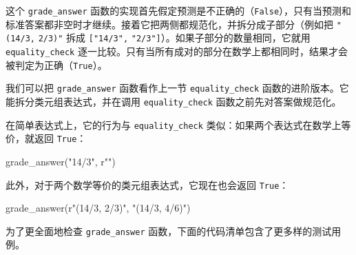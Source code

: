 这个 \texttt{grade\_answer} 函数的实现首先假定预测是不正确的（\texttt{False}），只有当预测和标准答案都非空时才继续。接着它把两侧都规范化，并拆分成子部分（例如把 \texttt{"}\texttt{(14/3,} \texttt{2/3)}\texttt{"} 拆成 \texttt{[}\texttt{"}\texttt{14/3}\texttt{"}\texttt{,} \texttt{"}\texttt{2/3}\texttt{"}\texttt{]}）。如果子部分的数量相同，它就用 \texttt{equality\_check} 逐一比较。只有当所有成对的部分在数学上都相同时，结果才会被判定为正确（\texttt{True}）。

我们可以把 \texttt{grade\_answer} 函数看作上一节 \texttt{equality\_check} 函数的进阶版本。它能拆分类元组表达式，并在调用 \texttt{equality\_check} 函数之前先对答案做规范化。

在简单表达式上，它的行为与 \texttt{equality\_check} 类似：如果两个表达式在数学上等价，就返回 \texttt{True}：

\begin{codebox}
grade_answer("14/3", r"")
\end{codebox}

此外，对于两个数学等价的类元组表达式，它现在也会返回 \texttt{True}：

\begin{codebox}
grade_answer(r"(14/3, 2/3)", "(14/3, 4/6)")
\end{codebox}

为了更全面地检查 \texttt{grade\_answer} 函数，下面的代码清单包含了更多样的测试用例。

